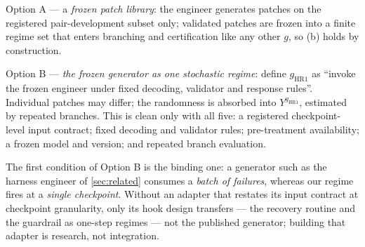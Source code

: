 \begin{remark}
Option A --- a \emph{frozen patch library}: the engineer generates patches on
the registered pair-development subset only; validated patches are frozen into a finite regime set
that enters branching and certification like any other $g$, so (b) holds by
construction.

Option B --- \emph{the frozen generator as one stochastic regime}: define
$g_{\mathrm{HR1}}$ as ``invoke the frozen engineer under fixed decoding,
validator and response rules''.  Individual patches may differ; the randomness
is absorbed into $Y^{g_{\mathrm{HR1}}}$, estimated by repeated branches.  This is
clean only with all five: a registered checkpoint-level input contract; fixed
decoding and validator rules; pre-treatment availability; a frozen model and
version; and repeated branch evaluation.

The first condition of Option B is the binding one: a generator such as the
harness engineer of \cref{sec:related} consumes a \emph{batch of failures},
whereas our regime fires at a \emph{single checkpoint}.  Without an adapter that
restates its input contract at checkpoint granularity, only its hook design
transfers --- the recovery routine and the guardrail as one-step regimes --- not
the published generator; building that adapter is research, not integration.
\end{remark}

